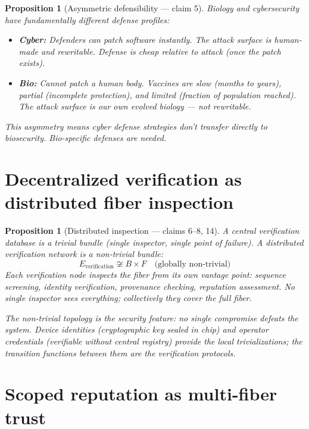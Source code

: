 \documentclass[11pt,a4paper]{article}
\newtheorem{proposition}[definition]{Proposition}
\begin{document}
\begin{proposition}[Asymmetric defensibility --- claim 5]
\label{prop:bio_cyber}
Biology and cybersecurity have fundamentally different defense profiles:
\begin{itemize}
  \item \textbf{Cyber:} Defenders can patch software instantly. The
    attack surface is human-made and rewritable. Defense is cheap
    relative to attack (once the patch exists).
  \item \textbf{Bio:} Cannot patch a human body. Vaccines are slow
    (months to years), partial (incomplete protection), and limited
    (fraction of population reached). The attack surface is our own
    evolved biology --- not rewritable.
\end{itemize}
This asymmetry means cyber defense strategies don't transfer directly
to biosecurity. Bio-specific defenses are needed.
\end{proposition}

\section{Decentralized verification as distributed fiber inspection}

\begin{proposition}[Distributed inspection --- claims 6--8, 14]
\label{prop:distributed}
A central verification database is a trivial bundle (single inspector,
single point of failure). A distributed verification network is a
non-trivial bundle:
\[
  E_{\text{verification}} \not\cong B \times F
  \quad \text{(globally non-trivial)}
\]
Each verification node inspects the fiber from its own vantage point:
sequence screening, identity verification, provenance checking,
reputation assessment. No single inspector sees everything;
collectively they cover the full fiber.

The non-trivial topology is the security feature: no single compromise
defeats the system. Device identities (cryptographic key sealed in chip)
and operator credentials (verifiable without central registry) provide
the local trivializations; the transition functions between them are
the verification protocols.
\end{proposition}

\section{Scoped reputation as multi-fiber trust}
\end{document}

